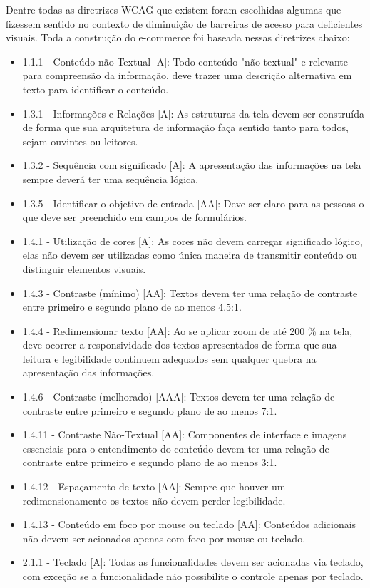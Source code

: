 {Dentre todas as diretrizes WCAG que existem foram escolhidas algumas que fizessem sentido no contexto de diminuição de barreiras de acesso para deficientes visuais. Toda a construção do e-commerce foi baseada nessas diretrizes abaixo: 
\begin{itemize}
\item 1.1.1 - Conteúdo não Textual [A]: Todo conteúdo "não textual" e relevante para compreensão da informação, deve trazer uma descrição alternativa em texto para identificar o conteúdo.
\item 1.3.1 - Informações e Relações [A]: As estruturas da tela devem ser construída de forma que sua arquitetura de informação faça sentido tanto para todos, sejam ouvintes ou leitores.
\item 1.3.2 - Sequência com significado [A]: A apresentação das informações na tela sempre deverá ter uma sequência lógica.
\item 1.3.5 - Identificar o objetivo de entrada [AA]: Deve ser claro para as pessoas o que deve ser preenchido em campos de formulários.
\item 1.4.1 - Utilização de cores [A]: As cores não devem carregar significado lógico, elas não devem ser utilizadas como única maneira de transmitir conteúdo ou distinguir elementos visuais.
\item 1.4.3 - Contraste (mínimo) [AA]: Textos devem ter uma relação de contraste entre primeiro e segundo plano de ao menos 4.5:1.
\item 1.4.4 - Redimensionar texto [AA]: Ao se aplicar zoom de até 200 \% na tela, deve ocorrer a responsividade dos textos apresentados de forma que sua leitura e legibilidade continuem adequados sem qualquer quebra na apresentação das informações.
\item 1.4.6 - Contraste (melhorado) [AAA]: Textos devem ter uma relação de contraste entre primeiro e segundo plano de ao menos 7:1.
\item 1.4.11 - Contraste Não-Textual [AA]: Componentes de interface e imagens essenciais para o entendimento do conteúdo devem ter uma relação de contraste entre primeiro e segundo plano de ao menos 3:1.
\item 1.4.12 - Espaçamento de texto [AA]: Sempre que houver um redimensionamento os textos não devem perder legibilidade.
\item 1.4.13 - Conteúdo em foco por mouse ou teclado [AA]: Conteúdos adicionais não devem ser acionados apenas com foco por mouse ou teclado. 
\item 2.1.1 - Teclado [A]: Todas as funcionalidades devem ser acionadas via teclado, com exceção se a funcionalidade não possibilite o controle apenas por teclado.

\end{itemize}}

